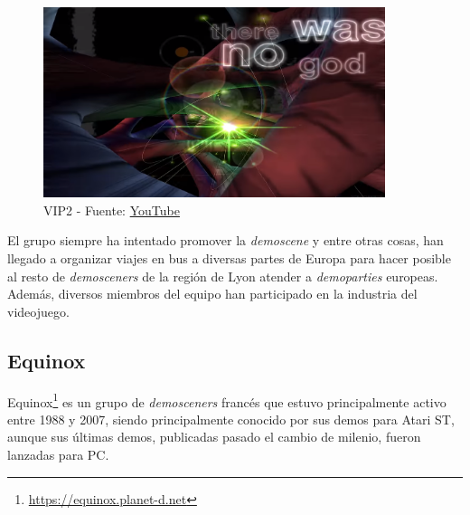 \begin{figure}[h]
	\centering
	\includegraphics[width=10cm]{archivos/vip2}
	\caption{VIP2 - Fuente: \href{https://www.youtube.com/watch?v=ObtPizPFMbo}{YouTube}}
	\label{fig:vip2}
\end{figure}

El grupo siempre ha intentado promover la \emph{demoscene} y entre otras cosas, han llegado a organizar viajes en bus a diversas partes de Europa para hacer posible al resto de \emph{demosceners} de la región de Lyon atender a \emph{demoparties} europeas. Además, diversos miembros del equipo han participado en la industria del videojuego.

\subsection{Equinox}

Equinox\footnote{\url{https://equinox.planet-d.net}} es un grupo de \emph{demosceners} francés que estuvo principalmente activo entre 1988 y 2007, siendo principalmente conocido por sus demos para Atari ST, aunque sus últimas demos, publicadas pasado el cambio de milenio, fueron lanzadas para PC.

